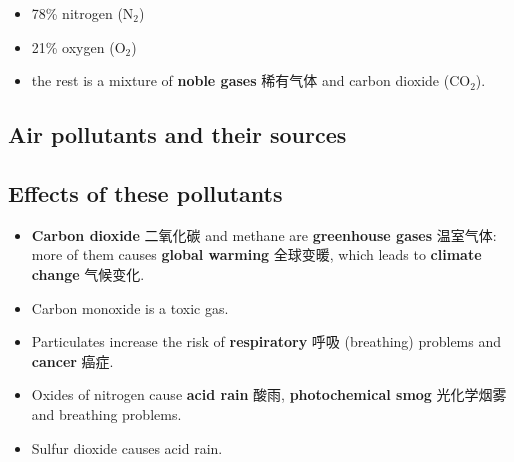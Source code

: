 \documentclass[11pt]{article}
\begin{document}
\begin{itemize}
\item 78\% nitrogen ($\text{N}_2$)

\item 21\% oxygen ($\text{O}_2$)

\item the rest is a mixture of \textbf{noble gases} 稀有气体 and carbon dioxide ($\text{CO}_2$).

\end{itemize}

\subsection*{Air pollutants and their sources}

\begin{center}
\end{center}

\subsection*{Effects of these pollutants}

\begin{itemize}
\item \textbf{Carbon dioxide} 二氧化碳 and methane are \textbf{greenhouse gases} 温室气体: more of them causes \textbf{global warming} 全球变暖, which leads to \textbf{climate change} 气候变化.

\item Carbon monoxide is a toxic gas.

\item Particulates increase the risk of \textbf{respiratory} 呼吸 (breathing) problems and \textbf{cancer} 癌症.

\item Oxides of nitrogen cause \textbf{acid rain} 酸雨, \textbf{photochemical smog} 光化学烟雾 and breathing problems.

\item Sulfur dioxide causes acid rain.

\end{itemize}
\end{document}

